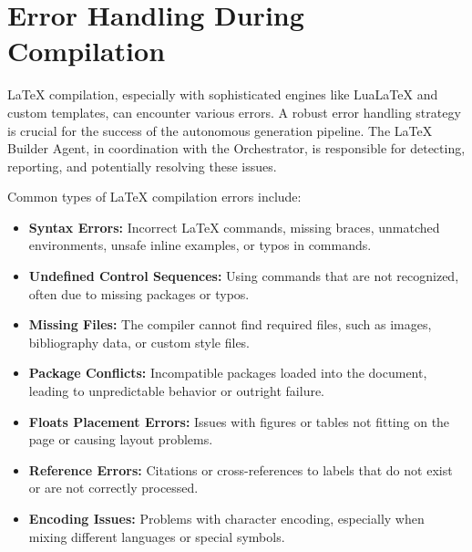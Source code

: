 \documentclass{custom-academic-template}
\begin{document}
\section{Error Handling During Compilation}
LaTeX compilation, especially with sophisticated engines like LuaLaTeX and custom templates, can encounter various errors. A robust error handling strategy is crucial for the success of the autonomous generation pipeline. The LaTeX Builder Agent, in coordination with the Orchestrator, is responsible for detecting, reporting, and potentially resolving these issues.

Common types of LaTeX compilation errors include:
\begin{itemize}
    \item \textbf{Syntax Errors:} Incorrect LaTeX commands, missing braces, unmatched environments, unsafe inline examples, or typos in commands.
    \item 	\textbf{Undefined Control Sequences:} Using commands that are not recognized, often due to missing packages or typos.
    \item 	\textbf{Missing Files:} The compiler cannot find required files, such as images, bibliography data, or custom style files.
    \item 	\textbf{Package Conflicts:} Incompatible packages loaded into the document, leading to unpredictable behavior or outright failure.
    \item 	\textbf{Floats Placement Errors:} Issues with figures or tables not fitting on the page or causing layout problems.
    \item 	\textbf{Reference Errors:} Citations or cross-references to labels that do not exist or are not correctly processed.
    \item 	\textbf{Encoding Issues:} Problems with character encoding, especially when mixing different languages or special symbols.
\end{itemize}
\end{document}
